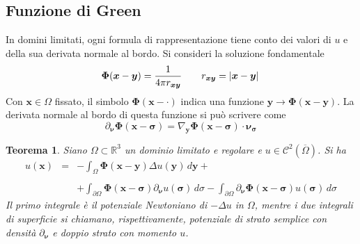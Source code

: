 \documentclass[a4paper,12pt, draft]{article}
\theoremstyle{break}
\newtheorem{theorem}{Teorema}[section]
\numberwithin{equation}{section}
\begin{document}
\subsection{Funzione di Green} 
In domini limitati, ogni formula di rappresentazione tiene conto dei valori di \(u\) e della sua derivata normale al bordo. Si consideri la soluzione fondamentale
\[
  \bm{\Phi} (\bm{x}-\bm{y}) = \frac{1}{4\pi r_{\bm{xy}}} \qquad r_{\bm{xy}} = \abs*{\bm{x} - \bm{y}}
\]
Con \(\bm{x} \in \Omega\) fissato, il simbolo \(\bm{\Phi}(\bm{x} - \bm{\cdot})\) indica una funzione \(\bm{y} \to \bm{\Phi}(\bm{x}-\bm{y})\). La derivata normale al bordo di questa funzione si può scrivere come 
\[
\partial_{\bm{\nu}}\bm{\Phi}(\bm{x} - \bm{\sigma}) = \nabla_{\bm{y}}\bm{\Phi} (\bm{x}-\bm{\sigma}) \cdot \bm{\nu_{\sigma}}
\]
\begin{theorem}
  Siano \(\Omega \subset \mathbb{R}^3\) un dominio limitato e regolare e \(u \in \mathcal{C}^2(\overline{\Omega})\). Si ha 
  \begin{equation}
    \begin{array}{lcl}
      u(\bm{x}) & = & -\int_{\Omega} \bm{\Phi} (\bm{x} - \bm{y}) \Delta u(\bm{y}) \, d\bm{y} + \\
      & & \\
      &  & + \int_{\partial \Omega} \bm{\Phi} (\bm{x} - \bm{\sigma}) \partial_{\bm{\nu}}u(\bm{\sigma}) \, d\sigma - \int_{\partial\Omega} \partial_{\bm{\nu}}\bm{\Phi}(\bm{x} - \bm{\sigma}) u(\bm{\sigma}) \, d\sigma
    \end{array}
  \end{equation}
Il primo integrale è il potenziale Newtoniano di \(-\Delta u\) in \(\Omega\), mentre i due integrali di superficie si chiamano, rispettivamente, \emph{potenziale di strato semplice con densità} \(\partial_{\bm{\nu}}\) e \emph{doppio strato con momento} \(u\). 
\end{theorem}
\end{document}

